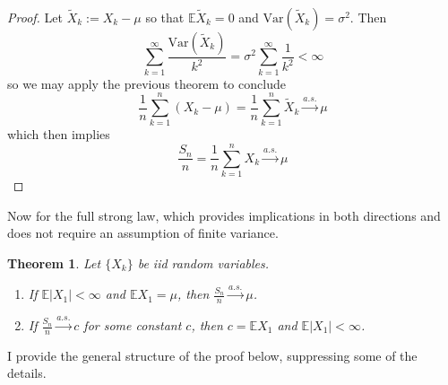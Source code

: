 \documentclass[12pt]{article}
\newcommand*{\abs}[1]{\left\lvert#1\right\rvert}
\newcommand{\E}{\mathbb{E}}
\newcommand{\Var}{\mathrm{Var}}
\newtheorem{thm}{Theorem}
\begin{document}
\begin{proof}
Let $\tilde{X}_k := X_k - \mu$ so that $\E \tilde{X}_k = 0$ and $\Var(\tilde{X}_k) = \sigma^2$. Then 
\[\sum_{k = 1}^{\infty} \frac{\Var(\tilde{X}_k)}{k^2} = \sigma^2 \sum_{k = 1}^{\infty} \frac{1}{k^2} < \infty\]
so we may apply the previous theorem to conclude 
\[\frac{1}{n} \sum_{k = 1}^{n} (X_k - \mu) = \frac{1}{n} \sum_{k = 1}^{n} \tilde{X}_k \overset{a.s.}{\to} \mu \]
which then implies 
\[\frac{S_n}{n} = \frac{1}{n} \sum_{k = 1}^{n} X_k \overset{a.s.}{\to} \mu \]
\end{proof}
Now for the full strong law, which provides implications in both directions and does not require an assumption of finite variance. 
\begin{thm}
Let $\{X_k\}$ be iid random variables. 
\begin{enumerate}
\item If $\E \abs{X_1} < \infty$ and $\E X_1 = \mu$, then $\frac{S_n}{n} \overset{a.s.}{\to} \mu$. 
\item If $\frac{S_n}{n} \overset{a.s.}{\to} c$ for some constant $c$, then $c = \E X_1$ and $\E \abs{X_1} < \infty$. 
\end{enumerate}
\end{thm}
I provide the general structure of the proof below, suppressing some of the details. 
\end{document}
